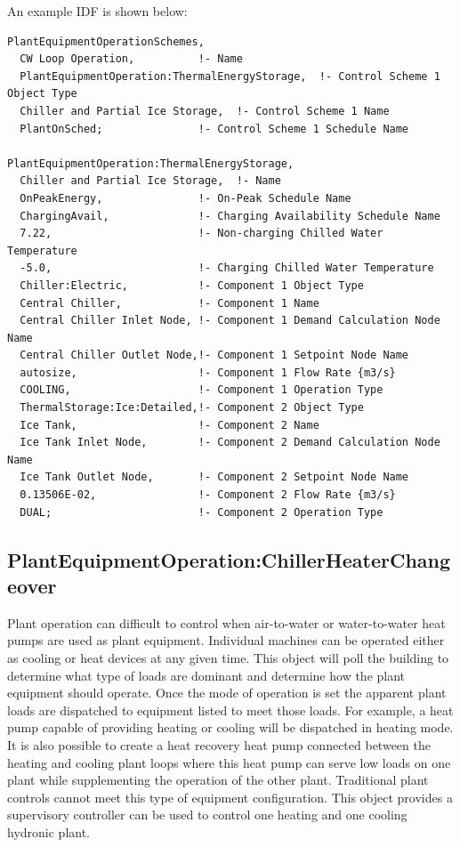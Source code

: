 An example IDF is shown below:

\begin{lstlisting}
PlantEquipmentOperationSchemes,
  CW Loop Operation,          !- Name
  PlantEquipmentOperation:ThermalEnergyStorage,  !- Control Scheme 1 Object Type
  Chiller and Partial Ice Storage,  !- Control Scheme 1 Name
  PlantOnSched;               !- Control Scheme 1 Schedule Name

PlantEquipmentOperation:ThermalEnergyStorage,
  Chiller and Partial Ice Storage,  !- Name
  OnPeakEnergy,               !- On-Peak Schedule Name
  ChargingAvail,              !- Charging Availability Schedule Name
  7.22,                       !- Non-charging Chilled Water Temperature
  -5.0,                       !- Charging Chilled Water Temperature
  Chiller:Electric,           !- Component 1 Object Type
  Central Chiller,            !- Component 1 Name
  Central Chiller Inlet Node, !- Component 1 Demand Calculation Node Name
  Central Chiller Outlet Node,!- Component 1 Setpoint Node Name
  autosize,                   !- Component 1 Flow Rate {m3/s}
  COOLING,                    !- Component 1 Operation Type
  ThermalStorage:Ice:Detailed,!- Component 2 Object Type
  Ice Tank,                   !- Component 2 Name
  Ice Tank Inlet Node,        !- Component 2 Demand Calculation Node Name
  Ice Tank Outlet Node,       !- Component 2 Setpoint Node Name
  0.13506E-02,                !- Component 2 Flow Rate {m3/s}
  DUAL;                       !- Component 2 Operation Type
\end{lstlisting}

\subsection{PlantEquipmentOperation:ChillerHeaterChangeover}\label{plantequipmentoperationchillerheaterchangeover}

Plant operation can difficult to control when air-to-water or water-to-water heat pumps are used as plant equipment.  Individual machines can be operated either as cooling or heat devices at any given time.  This object will poll the building to determine what type of loads are dominant and determine how the plant equipment should operate. Once the mode of operation is set the apparent plant loads are dispatched to equipment listed to meet those loads. For example, a heat pump capable of providing heating or cooling will be dispatched in heating mode. It is also possible to create a heat recovery heat pump connected between the heating and cooling plant loops where this heat pump can serve low loads on one plant while supplementing the operation of the other plant. Traditional plant controls cannot meet this type of equipment configuration. This object provides a supervisory controller can be used to control one heating and one cooling hydronic plant.

